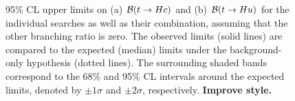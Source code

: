\begin{figure}[htbp]
\begin{center}
\caption{\small {95\% CL upper limits on (a) $\mathcal{B}(t\to Hc)$ and (b) $\mathcal{B}(t\to Hu)$ for the individual searches as well as their
combination, assuming that the other branching ratio is zero. The observed limits (solid lines) are compared to the 
expected (median) limits under the background-only
hypothesis (dotted lines). The surrounding shaded bands correspond to the 68\% and 95\% CL intervals around the expected limits, 
denoted by $\pm 1\sigma$ and $\pm 2\sigma$, respectively. \textbf{Improve style.}
}}
\label{fig:limits_combo_1D} 
\end{center}
\end{figure}


